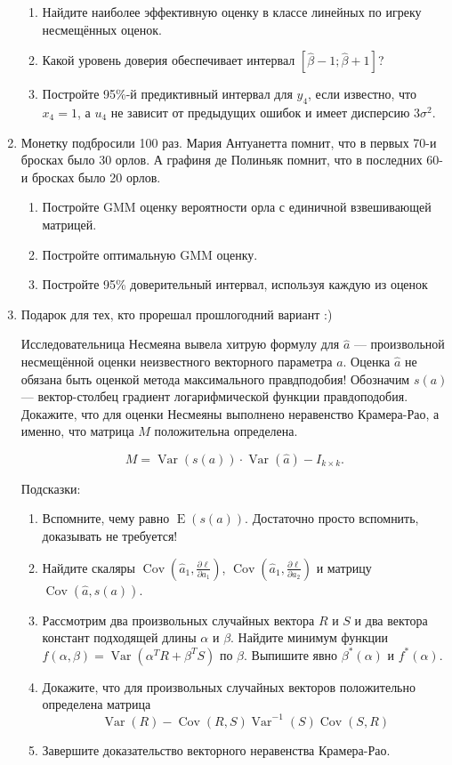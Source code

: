 \documentclass[12pt]{article}
\DeclareMathOperator{\Cov}{Cov}
\DeclareMathOperator{\Var}{Var}
\DeclareMathOperator{\E}{E}
\def \hb{\hat{\beta}}
\begin{document}
\begin{enumerate}
\begin{enumerate}
  \item Найдите наиболее эффективную оценку в классе линейных по игреку несмещённых оценок.
  \item Какой уровень доверия обеспечивает интервал $[\hb -1;\hb +1]$?
  \item Постройте 95\%-й предиктивный интервал для $y_4$, если известно, что $x_4=1$,
	а $u_4$ не зависит от предыдущих ошибок и имеет дисперсию $3\sigma^2$.
\end{enumerate}


\item Монетку подбросили 100 раз. Мария Антуанетта помнит, что в первых 70-и бросках было 30 орлов.
А графиня де Полиньяк помнит, что в последних 60-и бросках было 20 орлов.


\begin{enumerate}
  \item Постройте GMM оценку вероятности орла с единичной взвешивающей матрицей.
  \item Постройте оптимальную GMM оценку.
  \item Постройте 95\% доверительный интервал, используя каждую из оценок
\end{enumerate}

\newpage
\item Подарок для тех, кто прорешал прошлогодний вариант :)


   Исследовательница Несмеяна вывела хитрую формулу для $\hat a$ — произвольной несмещённой оценки неизвестного векторного параметра $a$. Оценка $\hat a$ не обязана быть оценкой метода максимального правдподобия!
    Обозначим $s(a)$ — вектор-столбец градиент логарифмической функции правдоподобия. Докажите, что для оценки Несмеяны выполнено неравенство Крамера-Рао,
    а именно, что матрица $M$  положительна определена.

\[
M = \Var(s(a))\cdot \Var(\hat a) - I_{k\times k}.
\]


Подсказки:

    \begin{enumerate}
      \item Вспомните, чему равно $\E(s(a))$. Достаточно просто вспомнить, доказывать не требуется!
      \item Найдите скаляры $\Cov\left(\hat a_1, \frac{\partial \ell}{\partial a_1}\right)$,
	$\Cov\left(\hat a_1, \frac{\partial \ell}{\partial a_2}\right)$
	и матрицу $\Cov\left(\hat a, s(a) \right)$.
      \item Рассмотрим два произвольных случайных вектора $R$ и $S$ и два вектора констант подходящей длины $\alpha$ и $\beta$.
	Найдите минимум функции $f(\alpha, \beta) = \Var(\alpha^T R + \beta^T S)$ по $\beta$.
	Выпишите явно $\beta^*(\alpha)$ и $f^*(\alpha)$.
      \item Докажите, что для произвольных случайных векторов положительно определена матрица
	\[
          \Var(R) - \Cov(R, S) \Var^{-1}(S)\Cov(S, R)
	\]
      \item Завершите доказательство векторного неравенства Крамера-Рао.



\end{enumerate}
\end{enumerate}
\end{document}
